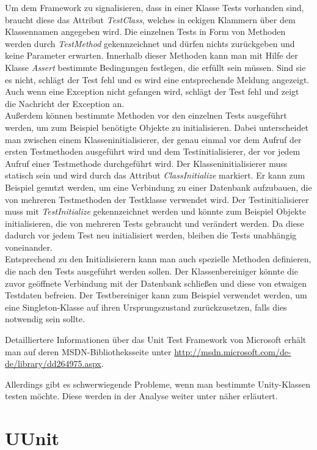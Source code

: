 Um dem Framework zu signalisieren, dass in einer Klasse Tests vorhanden sind, braucht diese das Attribut \textit{TestClass}, welches in eckigen Klammern über dem Klassennamen angegeben wird. Die einzelnen Tests in Form von Methoden werden durch \textit{TestMethod} gekennzeichnet und dürfen nichts zurückgeben und keine Parameter erwarten. Innerhalb dieser Methoden kann man mit Hilfe der Klasse \textit{Assert} bestimmte Bedingungen festlegen, die erfüllt sein müssen. Sind sie es nicht, schlägt der Test fehl und es wird eine entsprechende Meldung angezeigt. Auch wenn eine Exception nicht gefangen wird, schlägt der Test fehl und zeigt die Nachricht der Exception an.\\
Außerdem können bestimmte Methoden vor den einzelnen Tests ausgeführt werden, um zum Beispiel benötigte Objekte zu initialisieren. Dabei unterscheidet man zwischen einem Klasseninitialisierer, der genau einmal vor dem Aufruf der ersten Testmethoden ausgeführt wird und dem Testinitialisierer, der vor jedem Aufruf einer Testmethode durchgeführt wird. Der Klasseninitialisierer muss statisch sein und wird durch das Attribut \textit{ClassInitialize} markiert. Er kann zum Beispiel genutzt werden, um eine Verbindung zu einer Datenbank aufzubauen, die von mehreren Testmethoden der Testklasse verwendet wird. Der Testinitialisierer muss mit \textit{TestInitialize} gekennzeichnet werden und könnte zum Beispiel Objekte initialisieren, die von mehreren Tests gebraucht und verändert werden. Da diese dadurch vor jedem Test neu initialisiert werden, bleiben die Tests unabhängig voneinander.\\
Entsprechend zu den Initialisierern kann man auch spezielle Methoden definieren, die nach den Tests ausgeführt werden sollen. Der Klassenbereiniger könnte die zuvor geöffnete Verbindung mit der Datenbank schließen und diese von etwaigen Testdaten befreien. Der Testbereiniger kann zum Beispiel verwendet werden, um eine Singleton-Klasse auf ihren Ursprungszustand zurückzusetzen, falls dies notwendig sein sollte.

Detailliertere Informationen über das Unit Test Framework von Microsoft erhält man auf deren MSDN-Bibliotheksseite unter \url{http://msdn.microsoft.com/de-de/library/dd264975.aspx}.

Allerdings gibt es schwerwiegende Probleme, wenn man bestimmte Unity-Klassen testen möchte. Diese werden in der Analyse weiter unter näher erläutert.

\section{UUnit}

